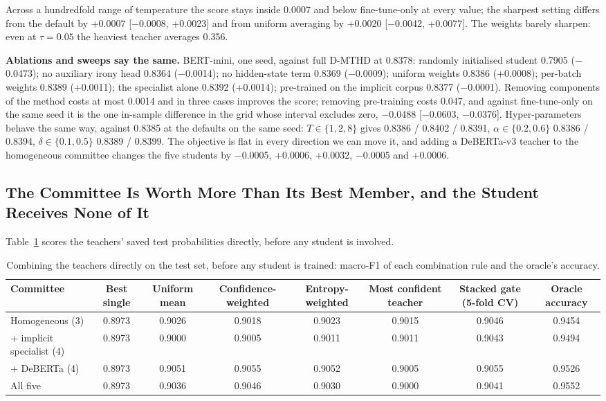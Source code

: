 Across a hundredfold range of temperature the score stays inside 0.0007 and below fine-tune-only at
every value; the sharpest setting differs from the default by +0.0007 [$-$0.0008, +0.0023] and from
uniform averaging by +0.0020 [$-$0.0042, +0.0077]. The weights barely sharpen: even at $\tau = 0.05$
the heaviest teacher averages 0.356.

\textbf{Ablations and sweeps say the same.} BERT-mini, one seed, against full D-MTHD at 0.8378:
randomly initialised student 0.7905 ($-$0.0473); no auxiliary irony head 0.8364 ($-$0.0014); no
hidden-state term 0.8369 ($-$0.0009); uniform weights 0.8386 (+0.0008); per-batch weights 0.8389
(+0.0011); the specialist alone 0.8392 (+0.0014); pre-trained on the implicit corpus 0.8377
($-$0.0001). Removing components of the method costs at most 0.0014 and in three cases improves the
score; removing pre-training costs 0.047, and against fine-tune-only on the same seed it is the one
in-sample difference in the grid whose interval excludes zero, $-$0.0488 [$-$0.0603, $-$0.0376].
Hyper-parameters behave the same way, against 0.8385 at the defaults on the same seed: $T \in \{1,
2, 8\}$ gives 0.8386 / 0.8402 / 0.8391, $\alpha \in \{0.2, 0.6\}$ 0.8386 / 0.8394, $\delta \in
\{0.1, 0.5\}$ 0.8389 / 0.8399. The objective is flat in every direction we can move it, and adding a
DeBERTa-v3 teacher to the homogeneous committee changes the five students by $-$0.0005, +0.0006,
+0.0032, $-$0.0005 and +0.0006.
\subsection{The Committee Is Worth More Than Its Best Member, and the Student Receives None of It}
\label{sec:5.4}
Table~\ref{tab:committee} scores the teachers' saved test probabilities directly, before any student
is involved.

\begin{table}[htbp]
\centering
\small
\caption[Combining the teachers directly on the test set]{Combining the teachers directly on the test set, before any student is trained: macro-F1 of each combination rule and the oracle's accuracy.}
\label{tab:committee}
\begin{adjustbox}{max width=\textwidth}
\begin{tabular}{lccccccc}
\toprule
Committee & Best single & Uniform mean & Confidence-weighted & Entropy-weighted & Most confident teacher & Stacked gate (5-fold CV) & Oracle accuracy \\
\midrule
Homogeneous (3) & 0.8973 & 0.9026 & 0.9018 & 0.9023 & 0.9015 & 0.9046 & 0.9454 \\
+ implicit specialist (4) & 0.8973 & 0.9000 & 0.9005 & 0.9011 & 0.9011 & 0.9043 & 0.9494 \\
+ DeBERTa (4) & 0.8973 & 0.9051 & 0.9055 & 0.9052 & 0.9005 & 0.9055 & 0.9526 \\
All five & 0.8973 & 0.9036 & 0.9046 & 0.9030 & 0.9000 & 0.9041 & 0.9552 \\
\bottomrule
\end{tabular}
\end{adjustbox}
\end{table}

